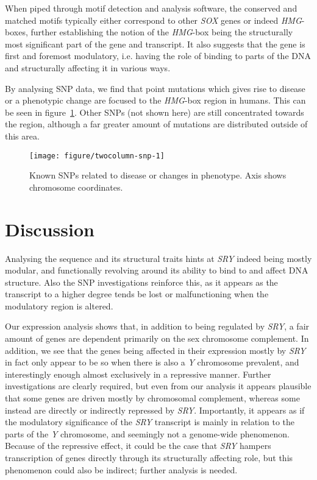 \documentclass[10pt, twocolumn]{article}\usepackage[]{graphicx}\usepackage[]{color}
\makeatletter
\def\maxwidth{ %
  \ifdim\Gin@nat@width>\linewidth
    \linewidth
  \else
    \Gin@nat@width
  \fi
}
\theoremstyle{plain}
\newcommand{\SRY}{\textit{SRY}\xspace}
\newcommand{\HMG}{\textit{HMG}\xspace}
\newcommand{\SOX}{\textit{SOX}\xspace}
\newcommand{\Y}{\textit{Y}\xspace}
\makeatother
\begin{document}
When piped through motif detection and analysis software, the conserved and matched motifs typically either correspond to other \SOX genes or indeed \HMG-boxes, further establishing the notion of the \HMG-box being the structurally most significant part of the gene and transcript. It also suggests that the gene is first and foremost modulatory, i.e. having the role of binding to parts of the DNA and structurally affecting it in various ways. 

By analysing SNP data, we find that point mutations which gives rise to disease or a phenotypic change are focused to the \HMG-box region in humans. This can be seen in figure~\cref{fig:snp}. Other SNPs (not shown here) are still concentrated towards the region, although a far greater amount of mutations are distributed outside of this area. 

\begin{Schunk}
\begin{figure}[H]

{\centering \texttt{[image: figure/twocolumn-snp-1]} 

}

\caption[Known SNPs related to disease or changes in phenotype]{Known SNPs related to disease or changes in phenotype. Axis shows chromosome coordinates.}\label{fig:snp}
\end{figure}
\end{Schunk}

\section*{Discussion}
Analysing the sequence and its structural traits hints at \SRY indeed being mostly modular, and functionally revolving around its ability to bind to and affect DNA structure. Also the SNP investigations reinforce this, as it appears as the transcript to a higher degree tends  be lost or malfunctioning when the modulatory region is altered.

Our expression analysis shows that, in addition to being regulated by \SRY, a fair amount of genes are dependent primarily on the sex chromosome complement. In addition, we see that the genes being affected in their expression mostly by \SRY in fact only appear to be so when there is also a \Y chromosome prevalent, and interestingly enough almost exclusively in a repressive manner. Further investigations are clearly required, but even from our analysis it appears plausible that some genes are driven mostly by chromosomal complement, whereas some instead are directly or indirectly repressed by \SRY. Importantly, it appears as if the modulatory significance of the \SRY transcript is mainly in relation to the parts of the \Y chromosome, and seemingly not a genome-wide phenomenon. Because of the repressive effect, it could be the case that \SRY hampers transcription of genes directly through its structurally affecting role, but this phenomenon could also be indirect; further analysis is needed.
\end{document}
